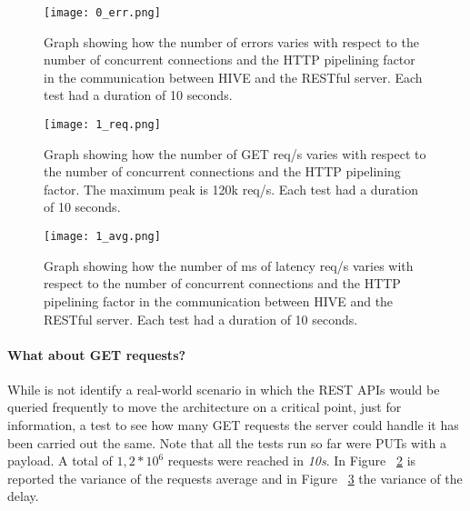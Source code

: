 \documentclass[]{IEEEtran}
\begin{document}
\begin{figure}[ht]
\centering
\texttt{[image: 0\_err.png]}
\vspace{-0.25cm}
\caption{Graph showing how the number of errors varies with respect to the number of concurrent connections and the HTTP pipelining factor in the communication between HIVE and the RESTful server. Each test had a duration of 10 seconds.}
\label{fig:graph03}
\vspace{-0.25cm}
\end{figure}




\begin{figure}[!bht]
\centering
\texttt{[image: 1\_req.png]}
\vspace{-0.25cm}
\caption{Graph showing how the number of GET req/s varies with respect to the number of concurrent connections and the HTTP pipelining factor. The maximum peak is 120k req/s. Each test had a duration of 10 seconds.}
\label{fig:get1}
\vspace{-0.25cm}
\end{figure}


\begin{figure}[!bht]
\centering
\texttt{[image: 1\_avg.png]}
\vspace{-0.25cm}
\caption{Graph showing how the number of ms of latency req/s varies with respect to the number of concurrent connections and the HTTP pipelining factor in the communication between HIVE and the RESTful server. Each test had a duration of 10 seconds.}
\label{fig:get2}
\vspace{-0.25cm}
\end{figure}

\paragraph{What about GET requests?}

While is not identify a real-world scenario in which the REST APIs would be queried frequently to move the architecture on a critical point, just for information, a test to see how many GET requests the server could handle it has been carried out the same. Note that all the tests run so far were PUTs with a payload. A total of $1,2*10^6$ requests were reached in \textit{10s}. In Figure ~\ref{fig:get1} is reported the variance of the requests average and in Figure ~\ref{fig:get2} the variance of the delay.
\end{document}
